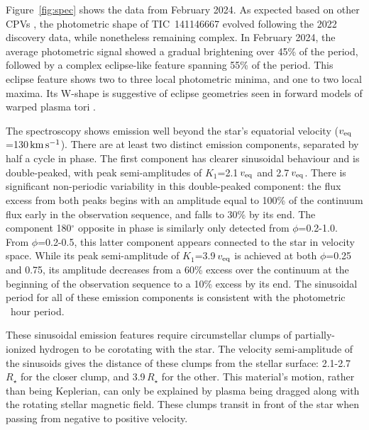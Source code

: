 \documentclass{nature3}
\newcommand{\kms}{\ensuremath{\rm km\,s^{-1}}}
\begin{document}
Figure~\ref{fig:spec} shows the data from February 2024.  As expected
based on other CPVs \cite{Bouma2024}, the photometric shape of
TIC~141146667 evolved following the 2022 discovery
data, while nonetheless remaining complex.  In February 2024, the
average photometric signal showed a gradual brightening over 45\% of
the period, followed by a complex eclipse-like feature spanning 55\%
of the period.  This eclipse feature shows two to three
local photometric minima, and one to two local maxima.
Its W-shape is suggestive of eclipse geometries seen in forward models
of warped plasma tori \cite{Townsend2008}.

The spectroscopy shows emission well beyond the star's equatorial
velocity ($v_{\rm eq}$=130\,\kms).  There are at least two distinct
emission components, separated by half a cycle in phase.  The
first component has clearer sinusoidal behaviour and is double-peaked, with peak
semi-amplitudes of $K_1$=2.1\,$v_{\rm eq}$ and 2.7\,$v_{\rm eq}$.
There is significant non-periodic variability in this double-peaked
component: the flux excess from both peaks begins with an amplitude
equal to 100\% of the continuum flux early in the observation
sequence, and falls to 30\% by its end.  The component 180$^\circ$
opposite in phase is similarly only detected from $\phi$=0.2-1.0.
From $\phi$=0.2-0.5, this latter component appears connected to the
star in velocity space.  While its peak semi-amplitude of
$K_1$=3.9\,$v_{\rm eq}$ is achieved at both $\phi$=0.25 and 0.75, its
amplitude decreases from a 60\% excess over the continuum at the
beginning of the observation sequence to a 10\% excess by its end.
The sinusoidal period for all of these emission components is consistent
with the photometric \periodhr\ hour period.  

These sinusoidal emission features require circumstellar clumps of
partially-ionized hydrogen to be corotating with the star.  The
velocity semi-amplitude of the sinusoids gives the distance
of these clumps from the stellar surface: 2.1-2.7\,$R_\star$ for the
closer clump, and 3.9\,$R_\star$ for the other.  This material's
motion, rather than being Keplerian, can only be explained by plasma
being dragged along with the rotating stellar magnetic field.  These
clumps transit in front of the star when passing from negative to
positive velocity.
\end{document}
